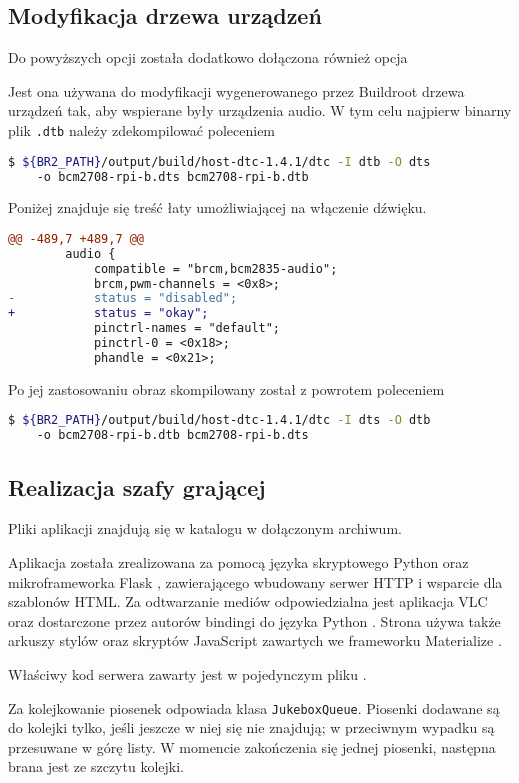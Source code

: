 \documentclass[10pt,a4paper]{article}
\newcommand{\centeredmenu}[1]{
	\begin{center}
		\menu{#1}
	\end{center}
}
\begin{document}
\subsection{Modyfikacja drzewa urządzeń}

Do powyższych opcji została dodatkowo dołączona również opcja
\centeredmenu{Host utilities > host dtc}
Jest ona używana do modyfikacji wygenerowanego przez Buildroot drzewa urządzeń tak, aby wspierane
były urządzenia audio. W tym celu najpierw binarny plik \texttt{.dtb} należy zdekompilować
poleceniem
\begin{lstlisting}[language=bash]
$ ${BR2_PATH}/output/build/host-dtc-1.4.1/dtc -I dtb -O dts
	-o bcm2708-rpi-b.dts bcm2708-rpi-b.dtb
\end{lstlisting}
Poniżej znajduje się treść łaty umożliwiającej na włączenie dźwięku.
\begin{lstlisting}[language=diff,caption=Łata włączająca wsparcie dla dźwięku]
@@ -489,7 +489,7 @@
 		audio {
 			compatible = "brcm,bcm2835-audio";
 			brcm,pwm-channels = <0x8>;
-			status = "disabled";
+			status = "okay";
 			pinctrl-names = "default";
 			pinctrl-0 = <0x18>;
 			phandle = <0x21>;
\end{lstlisting}
Po jej zastosowaniu obraz skompilowany został z powrotem poleceniem
\begin{lstlisting}[language=bash]
$ ${BR2_PATH}/output/build/host-dtc-1.4.1/dtc -I dts -O dtb
	-o bcm2708-rpi-b.dtb bcm2708-rpi-b.dts
\end{lstlisting}

\subsection{Realizacja szafy grającej}

Pliki aplikacji znajdują się w katalogu
w dołączonym archiwum.

Aplikacja została zrealizowana za pomocą języka skryptowego Python oraz mikroframeworka Flask
\cite{flask}, zawierającego wbudowany serwer HTTP i wsparcie dla szablonów HTML. Za odtwarzanie
mediów odpowiedzialna jest aplikacja VLC oraz dostarczone przez autorów bindingi do języka
Python \cite{vlc-bindings}. Strona używa także arkuszy stylów oraz skryptów JavaScript
zawartych we frameworku Materialize \cite{materialize}.

Właściwy kod serwera zawarty jest w pojedynczym pliku
.

Za kolejkowanie piosenek odpowiada klasa \texttt{JukeboxQueue}. Piosenki dodawane są do kolejki
tylko, jeśli jeszcze w niej się nie znajdują; w przeciwnym wypadku są przesuwane w górę listy.
W momencie zakończenia się jednej piosenki, następna brana jest ze szczytu kolejki.
\end{document}
